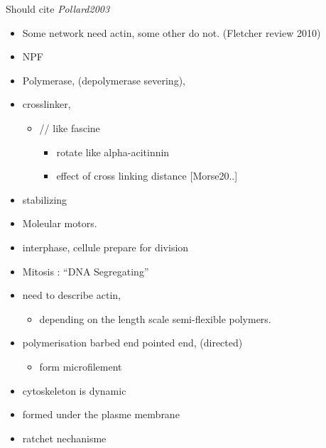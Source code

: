 \documentclass[A4paperpaper,11pt,english]{sphinxmanual}
\begin{document}
Should cite \emph{Pollard2003}
\begin{itemize}
\item {} 
Some network need actin, some other do not. (Fletcher review 2010)

\item {} 
NPF

\item {} 
Polymerase, (depolymerase severing),

\item {} 
crosslinker,
\begin{itemize}
\item {} 
// like fascine
\begin{itemize}
\item {} 
rotate like alpha-acitinnin

\item {} 
effect of cross linking distance {[}Morse20..{]}

\end{itemize}

\end{itemize}

\item {} 
stabilizing

\item {} 
Moleular motors.

\item {} 
interphase, cellule prepare for division

\item {} 
Mitosis : ``DNA Segregating''

\item {} 
need to describe actin,
\begin{itemize}
\item {} 
depending on the length scale semi-flexible polymers.

\end{itemize}

\item {} 
polymerisation barbed end pointed end, (directed)
\begin{itemize}
\item {} 
form microfilement

\end{itemize}

\item {} 
cytoskeleton is dynamic

\item {} 
formed under the plasme membrane

\item {} 
ratchet nechanisme


\end{itemize}
\end{document}
